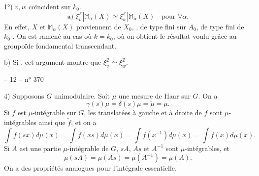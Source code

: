 1°) $v,w$ coïncident sur $k_0$.
\[
\text{a) }\xi_v^{\mathbb Z}|\mathbb M_\alpha(X)\simeq\xi_w^{\mathbb Z}|\mathbb M_\alpha(X)
\quad\text{pour }\forall\alpha.
\]
En effet, $X$ et $\mathbb M_\alpha(X)$ proviennent de
$X_0$, , de type fini sur $A_0$,  de
type fini de $k_0$ . On est ramené
au cas où $k=k_0$, où on obtient le
résultat voulu grâce au groupoïde fondamental
transcendant. 



b) Si , cet argument montre que
$\xi_v^{\mathbb Z}\simeq\xi_w^{\mathbb Z}$.
 

-- 12 -- \hfill n° 370

4) Supposons $G$ unimodulaire. Soit $\mu$ une mesure de Haar sur $G$. On a
\[
\tag{26} \gamma(s)\mu=\delta(s)\mu=\check\mu=\mu.
\]
Si $f$ est $\mu$-intégrable sur $G$, les translatées à gauche et à droite de $f$ sont
$\mu$-intégrables ainsi que $\check f$, et on a
\[
\tag{27} \int f(sx)d\mu(x)=\int f(xs)d\mu(x)=\int f(x^{-1})d\mu(x)=\int f(x)d\mu(x).
\]
Si $A$ est une partie $\mu$-intégrable de $G$, $sA$, $As$ et $A^{-1}$ sont $\mu$-intégrables, et
\[
\tag{28} \mu(sA)=\mu(As)=\mu(A^{-1})=\mu(A).
\]
On a des propriétés analogues pour l'intégrale essentielle.

